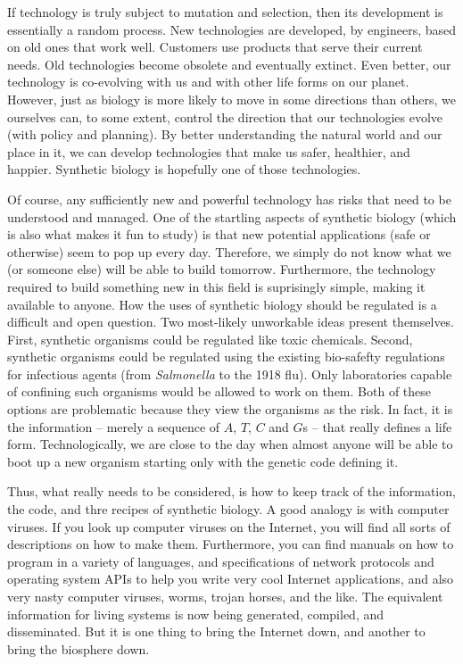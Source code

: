 If technology is truly subject to
mutation and selection, then its development is essentially a random
process. New technologies are developed, by engineers, based on old
ones that work well. Customers use products that serve their current
needs. Old technologies become obsolete and eventually extinct. Even
better, our technology is co-evolving with us and with other life
forms on our planet. However, just as biology is more likely to move
in some directions than others, we ourselves can, to some extent,
control the direction that our technologies evolve (with policy and
planning). By better understanding the natural world and our place in
it, we can develop technologies that make us safer, healthier, and
happier. Synthetic biology is hopefully one of those technologies.

Of course, any sufficiently new and powerful technology has risks that
need to be understood and managed. One of the startling aspects of
synthetic biology (which is also what makes it fun to study) is that
new potential applications (safe or otherwise) seem to pop up every
day. Therefore, we simply do not know what we (or someone else) will
be able to build tomorrow. Furthermore, the technology required to
build something new in this field is suprisingly simple, making it
available to anyone. How the uses of synthetic biology should be
regulated is a difficult and open question. Two most-likely unworkable
ideas present themselves. First, synthetic organisms could be
regulated like toxic chemicals. Second, synthetic organisms could be
regulated using the existing bio-safefty regulations for infectious
agents (from {\em Salmonella} to the 1918 flu). Only laboratories
capable of confining such organisms would be allowed to work on
them. Both of these options are problematic because they view the
organisms as the risk. In fact, it is the information -- merely a
sequence of $A$, $T$, $C$ and $G$s -- that really defines a life
form. Technologically, we are close to the day when almost anyone will
be able to boot up a new organism starting only with the genetic code
defining it.

Thus, what really needs to be considered, is how to keep track of the
information, the code, and thre recipes of synthetic biology. A good
analogy is with computer viruses. If you look up computer viruses on
the Internet, you will find all sorts of descriptions on how to make
them. Furthermore, you can find manuals on how to program in a variety
of languages, and specifications of network protocols and operating
system APIs to help you write very cool Internet applications, and
also very nasty computer viruses, worms, trojan horses, and the
like. The equivalent information for living systems is now being
generated, compiled, and disseminated. But it is one thing to bring
the Internet down, and another to bring the biosphere down.

